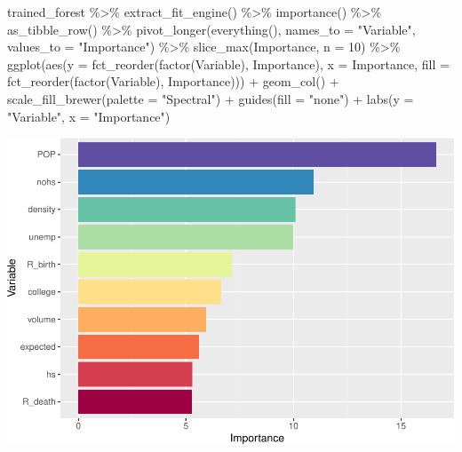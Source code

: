 \documentclass[
]{article}
\newenvironment{Shaded}{\begin{snugshade}}{\end{snugshade}}
\newcommand{\AttributeTok}[1]{\textcolor[rgb]{0.77,0.63,0.00}{#1}}
\newcommand{\DecValTok}[1]{\textcolor[rgb]{0.00,0.00,0.81}{#1}}
\newcommand{\FunctionTok}[1]{\textcolor[rgb]{0.00,0.00,0.00}{#1}}
\newcommand{\NormalTok}[1]{#1}
\newcommand{\SpecialCharTok}[1]{\textcolor[rgb]{0.00,0.00,0.00}{#1}}
\newcommand{\StringTok}[1]{\textcolor[rgb]{0.31,0.60,0.02}{#1}}
\begin{document}
\begin{Shaded}
\begin{Highlighting}[]
\NormalTok{trained\_forest }\SpecialCharTok{\%\textgreater{}\%}
  \FunctionTok{extract\_fit\_engine}\NormalTok{() }\SpecialCharTok{\%\textgreater{}\%}
  \FunctionTok{importance}\NormalTok{() }\SpecialCharTok{\%\textgreater{}\%}
  \FunctionTok{as\_tibble\_row}\NormalTok{() }\SpecialCharTok{\%\textgreater{}\%}
  \FunctionTok{pivot\_longer}\NormalTok{(}\FunctionTok{everything}\NormalTok{(), }\AttributeTok{names\_to =} \StringTok{"Variable"}\NormalTok{, }\AttributeTok{values\_to =} \StringTok{"Importance"}\NormalTok{) }\SpecialCharTok{\%\textgreater{}\%}
  \FunctionTok{slice\_max}\NormalTok{(Importance, }\AttributeTok{n =} \DecValTok{10}\NormalTok{) }\SpecialCharTok{\%\textgreater{}\%}
  \FunctionTok{ggplot}\NormalTok{(}\FunctionTok{aes}\NormalTok{(}\AttributeTok{y =} \FunctionTok{fct\_reorder}\NormalTok{(}\FunctionTok{factor}\NormalTok{(Variable), Importance), }\AttributeTok{x =}\NormalTok{ Importance, }
      \AttributeTok{fill =} \FunctionTok{fct\_reorder}\NormalTok{(}\FunctionTok{factor}\NormalTok{(Variable), Importance))) }\SpecialCharTok{+}
  \FunctionTok{geom\_col}\NormalTok{() }\SpecialCharTok{+}
  \FunctionTok{scale\_fill\_brewer}\NormalTok{(}\AttributeTok{palette =} \StringTok{"Spectral"}\NormalTok{) }\SpecialCharTok{+}
  \FunctionTok{guides}\NormalTok{(}\AttributeTok{fill =} \StringTok{"none"}\NormalTok{) }\SpecialCharTok{+} \FunctionTok{labs}\NormalTok{(}\AttributeTok{y =} \StringTok{"Variable"}\NormalTok{, }\AttributeTok{x =} \StringTok{"Importance"}\NormalTok{)}
\end{Highlighting}
\end{Shaded}

\includegraphics{figures/report/fig-unnamed-chunk-34-1.pdf}
\end{document}
